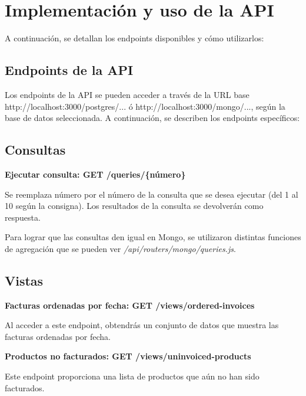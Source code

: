 \documentclass[a4paper,12pt]{article}
\begin{document}
	\newpage
	
	
	
	\section{Implementación y uso de la API}
	
	A continuación, se detallan los endpoints disponibles y cómo utilizarlos:
	
	\subsection{Endpoints de la API}
	
	Los endpoints de la API se pueden acceder a través de la URL base http://localhost:3000/postgres/... ó http://localhost:3000/mongo/..., según la base de datos seleccionada. A continuación, se describen los endpoints específicos:
	
	\subsection{Consultas}
	
	\textbf{Ejecutar consulta: GET /queries/\{número\}}
	
	\bigskip
	
	Se reemplaza {número} por el número de la consulta que se desea ejecutar (del 1 al 10 según la consigna). Los resultados de la consulta se devolverán como respuesta.
	
	\bigskip
	
	Para lograr que las consultas den igual en Mongo, se utilizaron distintas funciones de agregación que se pueden ver \textit{/api/routers/mongo/queries.js}.
	
	\subsection{Vistas}
	
	\textbf{Facturas ordenadas por fecha: GET /views/ordered-invoices}
	
	\bigskip
	
	Al acceder a este endpoint, obtendrás un conjunto de datos que muestra las facturas ordenadas por fecha.
	
	\bigskip
	
	\textbf{Productos no facturados: GET /views/uninvoiced-products}
	
	\bigskip
	
	Este endpoint proporciona una lista de productos que aún no han sido facturados.
	
\end{document}
